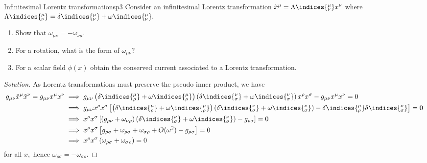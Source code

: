 \begin{problem}{Infinitesimal Lorentz transformations}{p3}
   Consider an infinitesimal Lorentz transformation \(\tilde{x}^\mu = \Lambda\indices{^\mu_\nu}x^\nu\) where \(\Lambda\indices{^\mu_\nu} = \delta\indices{^\mu_\nu} + \omega\indices{^\mu_\nu}.\)
   \begin{enumerate}[label=(\alph*)]
      \item Show that \(\omega_{\mu\nu} = -\omega_{\nu\mu}\).
      \item For a rotation, what is the form of \(\omega_{\mu\nu}\)?
      \item For a scalar field \(\phi(x)\) obtain the conserved current associated to a Lorentz transformation.
   \end{enumerate}
\end{problem}
\begin{proof}[Solution]
    As Lorentz transformations must preserve the pseudo inner product, we have
    \begin{align*}
       g_{\mu\nu} \tilde{x}^\mu \tilde{x}^\nu = g_{\mu\nu}x^\mu x^\nu 
       &\implies g_{\mu\nu}\left(\delta\indices{^\mu_\rho} + \omega\indices{^\mu_\rho}\right) \left(\delta\indices{^\nu_\sigma} + \omega\indices{^\nu_\sigma}\right) x^\rho x^\sigma - g_{\mu\nu} x^{\mu} x^\nu = 0\\
       &\implies g_{\mu\nu}x^\rho x^\sigma \left[\left(\delta\indices{^\mu_\rho} + \omega\indices{^\mu_\rho}\right) \left(\delta\indices{^\nu_\sigma} + \omega\indices{^\nu_\sigma}\right) - \delta\indices{^\mu_\rho} \delta\indices{^\nu_\sigma}\right] = 0\\
       &\implies x^\rho x^\sigma \left[\left(g_{\rho \nu} + \omega_{\nu \rho}\right)\left(\delta\indices{^\nu_\sigma} + \omega\indices{^\nu_\sigma}\right) - g_{\rho\sigma}\right] = 0\\
       &\implies x^\rho x^\sigma \left[g_{\rho\sigma} + \omega_{\rho \sigma} + \omega_{\sigma \rho} + O(\omega^2) - g_{\rho \sigma}\right] = 0\\
       &\implies x^\rho x^\sigma \left(\omega_{\rho \sigma} + \omega_{\sigma \rho}\right) = 0
    \end{align*}
    for all \(x,\) hence \(\omega_{\rho \sigma} = -\omega_{\sigma \rho}\).
\end{proof}
